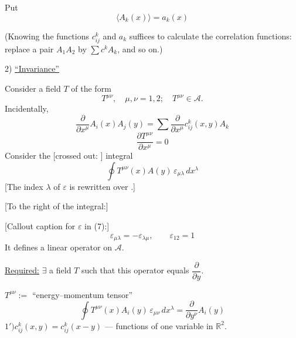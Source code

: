 Put
\begin{equation*}
\langle A_k(x)\rangle=a_k(x)
\end{equation*}

(Knowing the functions $c_{ij}^k$ and $a_k$ suffices to calculate the correlation
functions: replace a pair $A_1A_2$ by $\sum c^kA_k$, and so on.)

2) \underline{``Invariance''}

Consider a field $T$ of the form
\begin{equation*}
T^{\mu\nu},\quad\mu,\nu=1,2;\quad T^{\mu\nu}\in\mathcal A.
\end{equation*}
Incidentally,
\begin{equation*}
\frac{\partial}{\partial x^\mu}A_i(x)A_j(y)
=\sum\frac{\partial}{\partial x^\mu}c_{ij}^k(x,y)A_k
\tag{5}
\end{equation*}
\begin{equation*}
\frac{\partial T^{\mu\nu}}{\partial x^\mu}=0
\tag{6}
\end{equation*}
Consider the [crossed out: ] integral
\begin{equation*}
\oint T^{\mu\nu}(x)A(y)\,\varepsilon_{\mu\lambda}\,dx^\lambda
\tag{7}
\end{equation*}
[The index $\lambda$ of $\varepsilon$ is rewritten over
.]

[To the right of the integral:]
\begin{center}
\end{center}
[Callout caption for $\varepsilon$ in (7):]
\begin{equation*}
\varepsilon_{\mu\lambda}=-\varepsilon_{\lambda\mu},\qquad\varepsilon_{12}=1
\end{equation*}
It defines a linear operator on $\mathcal A$.

\underline{Required:} $\exists$ a field $T$ such that this operator equals $\dfrac{\partial}{\partial y}$.

$T^{\mu\nu}:=$ ``energy--momentum tensor''
\begin{equation*}
\oint T^{\mu\nu}(x)A_i(y)\,
\varepsilon_{\mu\nu}
\,dx^\lambda
=\frac{\partial}{\partial y^\nu}A_i(y)
\end{equation*}
$1')$\quad $c_{ij}^k(x,y)=c_{ij}^k(x-y)$ --- functions of one variable in $\mathbb R^2$.

